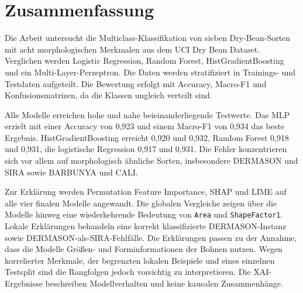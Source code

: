 \chapter*{Zusammenfassung}

Die Arbeit untersucht die Multiclass-Klassifikation von sieben Dry-Bean-Sorten mit acht morphologischen Merkmalen aus dem UCI Dry Bean Dataset. Verglichen werden Logistic Regression, Random Forest, HistGradientBoosting und ein Multi-Layer-Perzeptron. Die Daten werden stratifiziert in Trainings- und Testdaten aufgeteilt. Die Bewertung erfolgt mit Accuracy, Macro-F1 und Konfusionsmatrizen, da die Klassen ungleich verteilt sind.

Alle Modelle erreichen hohe und nahe beieinanderliegende Testwerte. Das MLP erzielt mit einer Accuracy von 0{,}923 und einem Macro-F1 von 0{,}934 das beste Ergebnis. HistGradientBoosting erreicht 0{,}920 und 0{,}932, Random Forest 0{,}918 und 0{,}931, die logistische Regression 0{,}917 und 0{,}931. Die Fehler konzentrieren sich vor allem auf morphologisch ähnliche Sorten, insbesondere DERMASON und SIRA sowie BARBUNYA und CALI.

Zur Erklärung werden Permutation Feature Importance, SHAP und LIME auf alle vier finalen Modelle angewandt. Die globalen Vergleiche zeigen über die Modelle hinweg eine wiederkehrende Bedeutung von \texttt{Area} und \texttt{ShapeFactor1}. Lokale Erklärungen behandeln eine korrekt klassifizierte DERMASON-Instanz sowie DERMASON-als-SIRA-Fehlfälle. Die Erklärungen passen zu der Annahme, dass die Modelle Größen- und Forminformationen der Bohnen nutzen. Wegen korrelierter Merkmale, der begrenzten lokalen Beispiele und eines einzelnen Testsplit sind die Rangfolgen jedoch vorsichtig zu interpretieren. Die XAI-Ergebnisse beschreiben Modellverhalten und keine kausalen Zusammenhänge.



